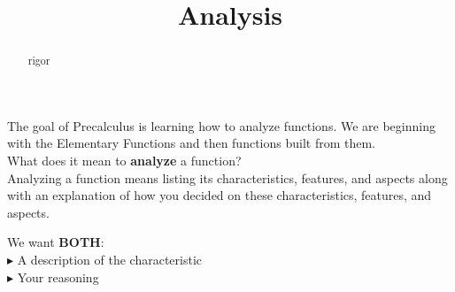 \documentclass{ximera}
\title{Analysis}
\begin{document}
\begin{abstract}
rigor
\end{abstract}
\maketitle





The goal of Precalculus is learning how to analyze functions.  We are beginning with the Elementary Functions and then functions built from them. \\

What does it mean to \textbf{\textcolor{blue!55!black}{analyze}} a function? \\ 



Analyzing a function means listing its characteristics, features, and aspects along with an explanation of how you decided on these characteristics, features, and aspects.


We want \textbf{BOTH}: \\
\textbf{\textcolor{red!90!darkgray}{$\blacktriangleright$}} A description of the characteristic \\
\textbf{\textcolor{red!90!darkgray}{$\blacktriangleright$}} Your reasoning \\
\end{document}
